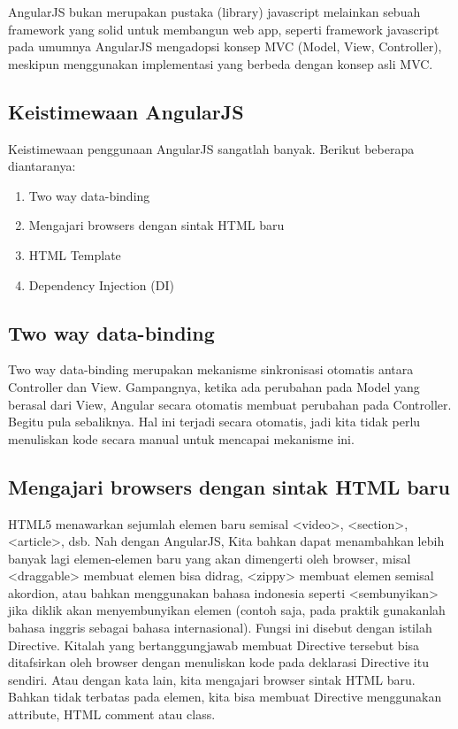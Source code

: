 	AngularJS bukan merupakan pustaka (library) javascript melainkan sebuah framework yang solid untuk membangun web app, seperti framework javascript pada umumnya AngularJS mengadopsi konsep MVC (Model, View, Controller), meskipun menggunakan implementasi yang berbeda dengan konsep asli MVC.
	
\subsection{Keistimewaan AngularJS}
\label{sec: keistimewaanAngularJS}
	Keistimewaan penggunaan AngularJS sangatlah banyak. Berikut beberapa diantaranya:
	
	\begin{enumerate}
		\item Two way data-binding
		\item Mengajari browsers dengan sintak HTML baru	
		\item HTML Template
		\item Dependency Injection (DI)
	\end{enumerate}
	
\subsection{Two way data-binding}
\label{sub: twoWayDataBinding}

	Two way data-binding merupakan mekanisme sinkronisasi otomatis antara Controller dan View. Gampangnya, ketika ada perubahan pada Model yang berasal dari View, Angular secara otomatis membuat perubahan pada Controller. Begitu pula sebaliknya. Hal ini terjadi secara otomatis, jadi kita tidak perlu menuliskan kode secara manual untuk mencapai mekanisme ini.

\subsection{Mengajari browsers dengan sintak HTML baru}
\label{sub: mengajariBrowsersDenganSintakHTMLBaru}

	HTML5 menawarkan sejumlah elemen baru semisal <video>, <section>, <article>, dsb. Nah dengan AngularJS, Kita bahkan dapat menambahkan lebih banyak lagi elemen-elemen baru yang akan dimengerti oleh browser, misal <draggable> membuat elemen bisa didrag, <zippy> membuat elemen semisal akordion, atau bahkan menggunakan bahasa indonesia seperti <sembunyikan> jika diklik akan menyembunyikan elemen (contoh saja, pada praktik gunakanlah bahasa inggris sebagai bahasa internasional). Fungsi ini disebut dengan istilah Directive. Kitalah yang bertanggungjawab membuat Directive tersebut bisa ditafsirkan oleh browser dengan menuliskan kode pada deklarasi Directive itu sendiri. Atau dengan kata lain, kita mengajari browser sintak HTML baru. Bahkan tidak terbatas pada elemen, kita bisa membuat Directive menggunakan attribute, HTML comment atau class.

